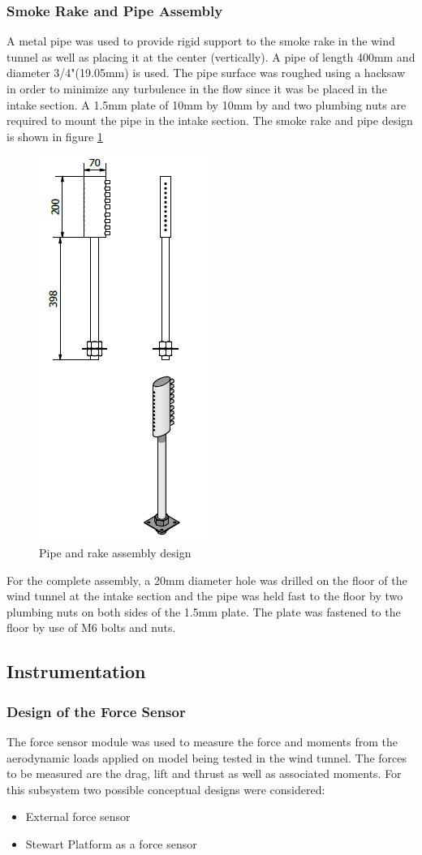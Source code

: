 \subsubsection*{Smoke Rake and Pipe Assembly}
A metal pipe was used to provide rigid support to the smoke rake in the wind tunnel as well as placing it at the center
(vertically). A pipe of length 400mm and diameter 3/4"(19.05mm) is used. The pipe surface was roughed using a hacksaw in
order to minimize any turbulence in the flow since it was be placed in the intake section. A 1.5mm plate of 10mm by 10mm by
and two plumbing nuts are required to mount the pipe in the intake section. The smoke rake and pipe design is shown
in figure \ref{pipe and rake}
\begin{center}
	\begin{figure}[H]
		\centering
		\includegraphics[width=0.25\linewidth]{Figures/pipe and rake.JPG}
		\caption[Pipe and rake]{Pipe and rake assembly design}
		\label{pipe and rake}
	\end{figure}
\end{center}
For the complete assembly, a 20mm diameter hole was drilled on the floor of the wind tunnel at the intake section
and the pipe was held fast to the floor by two plumbing nuts on both sides of the 1.5mm plate. The plate was fastened to
the floor by use of M6 bolts and nuts.
\subsection{Instrumentation}
\subsubsection{Design of the Force Sensor}
The force sensor module was used to measure the force and moments from the aerodynamic loads applied on model 
being tested in the wind tunnel. The forces to be measured are the drag, lift and thrust as well as
 associated moments. For this subsystem two possible conceptual designs were considered:
\begin{itemize}
	\item External force sensor
	\item Stewart Platform as a force sensor
\end{itemize}
